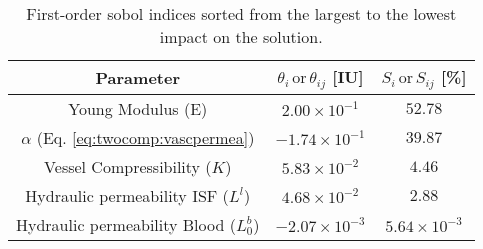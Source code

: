 \begin{table}[ht!]
\centering
{%
\begin{tabular}{ccc}
\hline
Parameter                          & $\theta_i\, \text{or}\,\theta_{ij}$ [IU] & $S_i\,\text{or}\,S_{ij}$ [\%] \\ \hline
Young Modulus (E)                  & $2.00\times10^{-1}$             & $52.78$               \\
$\alpha$ (Eq. \ref{eq:twocomp:vascpermea})     & $-1.74\times10^{-1}$            & $39.87$               \\
Vessel Compressibility ($K$)         & $5.83\times10^{-2}$             & $4.46$               \\
Hydraulic permeability ISF ($L^l$) & $4.68\times10^{-2}$             & $2.88$               \\
Hydraulic permeability Blood ($L^b_0$) & $-2.07\times10^{-3}$            & $5.64\times10^{-3}$  \\ \hline
\end{tabular}%
}
\caption{First-order sobol indices sorted from the largest to the lowest impact on the solution.}
\label{tab:sobol:01}
\end{table}